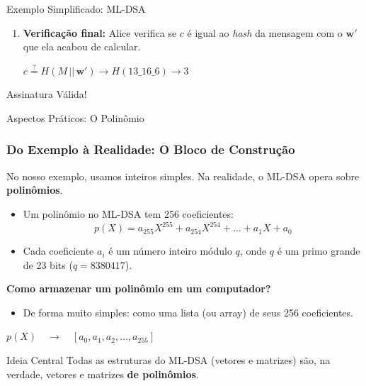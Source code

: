 \documentclass{beamer}
\begin{document}
\begin{frame}{Exemplo Simplificado: ML-DSA}
\begin{enumerate}
        \item<+-> \textbf{Verificação final:} Alice verifica se $c$ é igual ao \textit{hash} da mensagem com o $\mathbf{w'}$ que ela acabou de calcular.
        \begin{center}
            $ c \stackrel{?}{=} H(M \,||\, \mathbf{w'}) \rightarrow H(13\_16\_6) \rightarrow 3 $    
        \end{center}
               
    \end{enumerate}
    \pause
    \begin{center}
        \huge \textcolor{green!70!black}{Assinatura Válida!}
    \end{center}
\end{frame}

\begin{frame}{Aspectos Práticos: O Polinômio}
    \frametitle{Do Exemplo à Realidade: O Bloco de Construção}

    No nosso exemplo, usamos inteiros simples. Na realidade, o ML-DSA opera sobre \textbf{polinômios}.
    \vfill
    \begin{itemize}
        \item Um polinômio no ML-DSA tem 256 coeficientes:
        $$ p(X) = a_{255}X^{255} + a_{254}X^{254} + \dots + a_1X + a_0 $$
        
        \item Cada coeficiente $a_i$ é um número inteiro módulo $q$, onde $q$ é um primo grande de 23 bits ($q = 8380417$).
    \end{itemize}
    \vfill
    \pause
    
    \textbf{Como armazenar um polinômio em um computador?}
    \begin{itemize}
        \item De forma muito simples: como uma lista (ou array) de seus 256 coeficientes.
    \end{itemize}
    
    \begin{center}
    \large
    $p(X) \quad \longrightarrow \quad [a_0, a_1, a_2, \dots, a_{255}]$
    \end{center}
    
    \vfill
    \begin{alertblock}{Ideia Central}
        Todas as estruturas do ML-DSA (vetores e matrizes) são, na verdade, vetores e matrizes \textbf{de polinômios}.
    \end{alertblock}
\end{frame}
\end{document}
